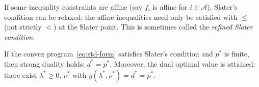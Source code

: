 \documentclass[11pt,a4paper]{article}
\begin{document}
\begin{remark}\label{rem:slater-affine}
If some inequality constraints are affine (say $f_i$ is affine for
$i \in \mathcal{A}$), Slater's condition can be relaxed: the affine
inequalities need only be satisfied with $\le$ (not strictly $<$) at
the Slater point. This is sometimes called the \emph{refined Slater
condition}.
\end{remark}

\begin{theorem}\label{thm:strong-duality}
If the convex program~\eqref{eq:std-form} satisfies Slater's condition and
$p^*$ is finite, then strong duality holds: $d^* = p^*$. Moreover, the dual
optimal value is attained: there exist $\lambda^* \ge 0$, $\nu^*$ with
$g(\lambda^*, \nu^*) = d^* = p^*$.
\end{theorem}
\end{document}
